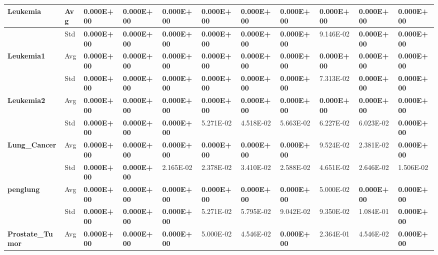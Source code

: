 \documentclass{article} %
\begin{document}
\begin{tabular}{|p{0.6in}|p{0.3in}|p{0.4in}|p{0.4in}|p{0.4in}|p{0.4in}|p{0.4in}|p{0.4in}|p{0.4in}|p{0.4in}|p{0.4in}|}
\textbf{Leukemia} & Avg & \textbf{0.000E+00} & \textbf{0.000E+00} & \textbf{0.000E+00} & \textbf{0.000E+00} & \textbf{0.000E+00} & \textbf{0.000E+00} & \textbf{0.000E+00} & \textbf{0.000E+00} & \textbf{0.000E+00} \\ \hline 
\textbf{} & Std & \textbf{0.000E+00} & \textbf{0.000E+00} & \textbf{0.000E+00} & \textbf{0.000E+00} & \textbf{0.000E+00} & \textbf{0.000E+00} & 9.146E-02 & \textbf{0.000E+00} & \textbf{0.000E+00} \\ \hline 
\textbf{Leukemia1} & Avg & \textbf{0.000E+00} & \textbf{0.000E+00} & \textbf{0.000E+00} & \textbf{0.000E+00} & \textbf{0.000E+00} & \textbf{0.000E+00} & \textbf{0.000E+00} & \textbf{0.000E+00} & \textbf{0.000E+00} \\ \hline 
\textbf{} & Std & \textbf{0.000E+00} & \textbf{0.000E+00} & \textbf{0.000E+00} & \textbf{0.000E+00} & \textbf{0.000E+00} & \textbf{0.000E+00} & 7.313E-02 & \textbf{0.000E+00} & \textbf{0.000E+00} \\ \hline 
\textbf{Leukemia2} & Avg & \textbf{0.000E+00} & \textbf{0.000E+00} & \textbf{0.000E+00} & \textbf{0.000E+00} & \textbf{0.000E+00} & \textbf{0.000E+00} & \textbf{0.000E+00} & \textbf{0.000E+00} & \textbf{0.000E+00} \\ \hline 
\textbf{} & Std & \textbf{0.000E+00} & \textbf{0.000E+00} & \textbf{0.000E+00} & 5.271E-02 & 4.518E-02\textbf{} & 5.663E-02 & 6.227E-02 & 6.023E-02 & \textbf{0.000E+00} \\ \hline 
\textbf{Lung\_Cancer} & Avg & \textbf{0.000E+00} & \textbf{0.000E+00} & \textbf{0.000E+00} & \textbf{0.000E+00} & \textbf{0.000E+00} & \textbf{0.000E+00} & 9.524E-02 & 2.381E-02 & \textbf{0.000E+00} \\ \hline 
\textbf{} & Std & \textbf{0.000E+00} & \textbf{0.000E+00} & 2.165E-02 & 2.378E-02 & 3.410E-02\textbf{} & 2.588E-02 & 4.651E-02 & 2.646E-02 & 1.506E-02 \\ \hline 
\textbf{penglung} & Avg & \textbf{0.000E+00} & \textbf{0.000E+00} & \textbf{0.000E+00} & \textbf{0.000E+00} & \textbf{0.000E+00} & \textbf{0.000E+00} & 5.000E-02\textbf{} & \textbf{0.000E+00} & \textbf{0.000E+00} \\ \hline 
\textbf{} & Std & \textbf{0.000E+00} & \textbf{0.000E+00} & \textbf{0.000E+00} & 5.271E-02 & 5.795E-02 & 9.042E-02 & 9.350E-02\textbf{} & 1.084E-01 & \textbf{0.000E+00} \\ \hline 
\textbf{Prostate\_Tumor} & Avg & \textbf{0.000E+00} & \textbf{0.000E+00} & \textbf{0.000E+00} & 5.000E-02 & 4.546E-02\textbf{} & \textbf{0.000E+00} & 2.364E-01\textbf{} & 4.546E-02 & \textbf{0.000E+00} \\ \hline 

\end{tabular}
\end{document}
